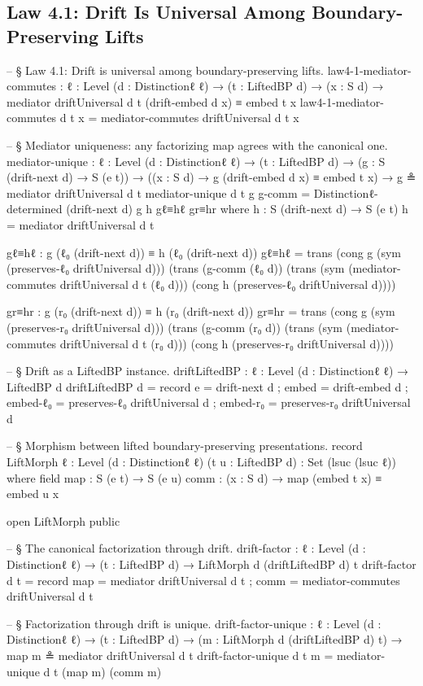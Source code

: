 \documentclass[11pt,a4paper]{book}
\begin{document}
\subsection{Law 4.1: Drift Is Universal Among Boundary-Preserving Lifts}

\begin{code}
-- § Law 4.1: Drift is universal among boundary-preserving lifts.
law4-1-mediator-commutes :
  {ℓ : Level} (d : Distinctionℓ ℓ) → (t : LiftedBP d) →
  (x : S d) → mediator driftUniversal d t (drift-embed d x) ≡ embed t x
law4-1-mediator-commutes d t x = mediator-commutes driftUniversal d t x

-- § Mediator uniqueness: any factorizing map agrees with the canonical one.
mediator-unique :
  {ℓ : Level} (d : Distinctionℓ ℓ) → (t : LiftedBP d) →
  (g : S (drift-next d) → S (e t)) →
  ((x : S d) → g (drift-embed d x) ≡ embed t x) →
  g ≗ mediator driftUniversal d t
mediator-unique d t g g-comm =
  Distinctionℓ-determined (drift-next d) g h gℓ≡hℓ gr≡hr
  where
    h : S (drift-next d) → S (e t)
    h = mediator driftUniversal d t

    gℓ≡hℓ : g (ℓ₀ (drift-next d)) ≡ h (ℓ₀ (drift-next d))
    gℓ≡hℓ =
      trans (cong g (sym (preserves-ℓ₀ driftUniversal d)))
        (trans (g-comm (ℓ₀ d))
          (trans (sym (mediator-commutes driftUniversal d t (ℓ₀ d)))
            (cong h (preserves-ℓ₀ driftUniversal d))))

    gr≡hr : g (r₀ (drift-next d)) ≡ h (r₀ (drift-next d))
    gr≡hr =
      trans (cong g (sym (preserves-r₀ driftUniversal d)))
        (trans (g-comm (r₀ d))
          (trans (sym (mediator-commutes driftUniversal d t (r₀ d)))
            (cong h (preserves-r₀ driftUniversal d))))

-- § Drift as a LiftedBP instance.
driftLiftedBP : {ℓ : Level} (d : Distinctionℓ ℓ) → LiftedBP d
driftLiftedBP d = record
  { e        = drift-next d
  ; embed    = drift-embed d
  ; embed-ℓ₀ = preserves-ℓ₀ driftUniversal d
  ; embed-r₀ = preserves-r₀ driftUniversal d
  }

-- § Morphism between lifted boundary-preserving presentations.
record LiftMorph {ℓ : Level} (d : Distinctionℓ ℓ) (t u : LiftedBP d) : Set (lsuc (lsuc ℓ)) where
  field
    map  : S (e t) → S (e u)
    comm : (x : S d) → map (embed t x) ≡ embed u x

open LiftMorph public

-- § The canonical factorization through drift.
drift-factor :
  {ℓ : Level} (d : Distinctionℓ ℓ) → (t : LiftedBP d) →
  LiftMorph d (driftLiftedBP d) t
drift-factor d t = record
  { map  = mediator driftUniversal d t
  ; comm = mediator-commutes driftUniversal d t
  }

-- § Factorization through drift is unique.
drift-factor-unique :
  {ℓ : Level} (d : Distinctionℓ ℓ) → (t : LiftedBP d) →
  (m : LiftMorph d (driftLiftedBP d) t) →
  map m ≗ mediator driftUniversal d t
drift-factor-unique d t m =
  mediator-unique d t (map m) (comm m)
\end{code}
\end{document}
